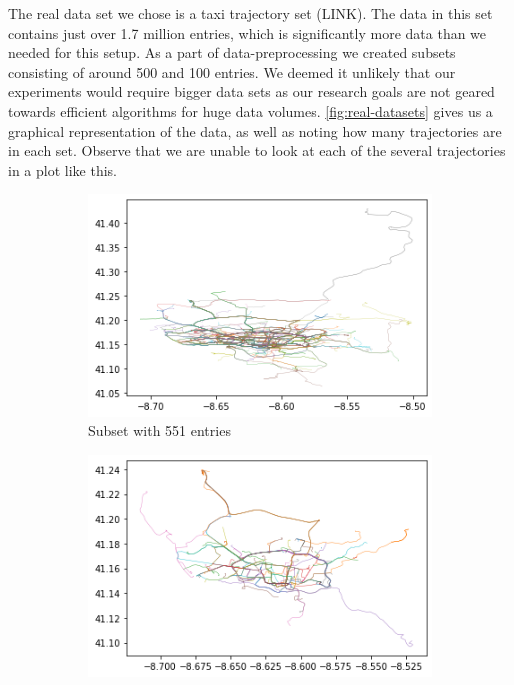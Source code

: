 The real data set we chose is a taxi trajectory set (LINK). 
The data in this set contains just over 1.7 million entries, which is significantly more data than we needed for this setup.
As a part of data-preprocessing we created subsets consisting of around 500 and 100 entries. 
We deemed it unlikely that our experiments would require bigger data sets as our research goals are not geared towards efficient algorithms for huge data volumes. \autoref{fig:real-datasets} gives us a graphical representation of the data, as well as noting how many trajectories are in each set. Observe that we are unable to look at each of the several trajectories in a plot like this.  

\begin{figure}
    \centering
    \begin{subfigure}{.30\textwidth}
        \centering
        \includegraphics[width=\textwidth]{figures/REAL_MED.png}
        \caption{Subset with 551 entries}
        \label{sfig:real-med}
    \end{subfigure}
    \hfill
    \begin{subfigure}{.30\textwidth}
        \centering
        \includegraphics[width=\textwidth]{figures/REAL_MINI.png}

\end{subfigure}
\end{figure}
